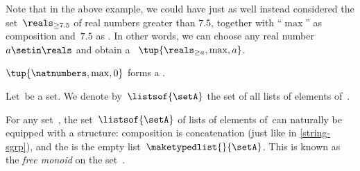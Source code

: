 \begin{remark}
    Note that in the above example, we could have just as well instead considered the set~$\reals_{\geq 7.5}$ of real numbers greater than $7.5$, together with ``$\max$'' as composition and~$7.5$ as .
    In other words, we can choose any real number $a \setin \reals$ and obtain a ~$\tup{\reals_{\geq a},\max, a}$.
\end{remark}

\begin{example}
    $\tup{\natnumbers, {{\max}},0}$ forms a .
\end{example}

\begin{definition}
    \label{def:set-of-lists}
    Let~\setA be a set.
    We denote by~$\listsof{\setA}$ the set of all lists of elements of~\setA.
\end{definition}

\begin{example}
    \label{exa:string-monoid}
    For any set~\setA, the set~$\listsof{\setA}$ of lists of elements of~\setA can naturally be equipped with a  structure: composition is concatenation (just like in \cref{string-sgrp}), and the  is the empty list~$\maketypedlist{}{\setA}$.
    This  is known as the \emph{free monoid} on the set~\setA.
\end{example}

